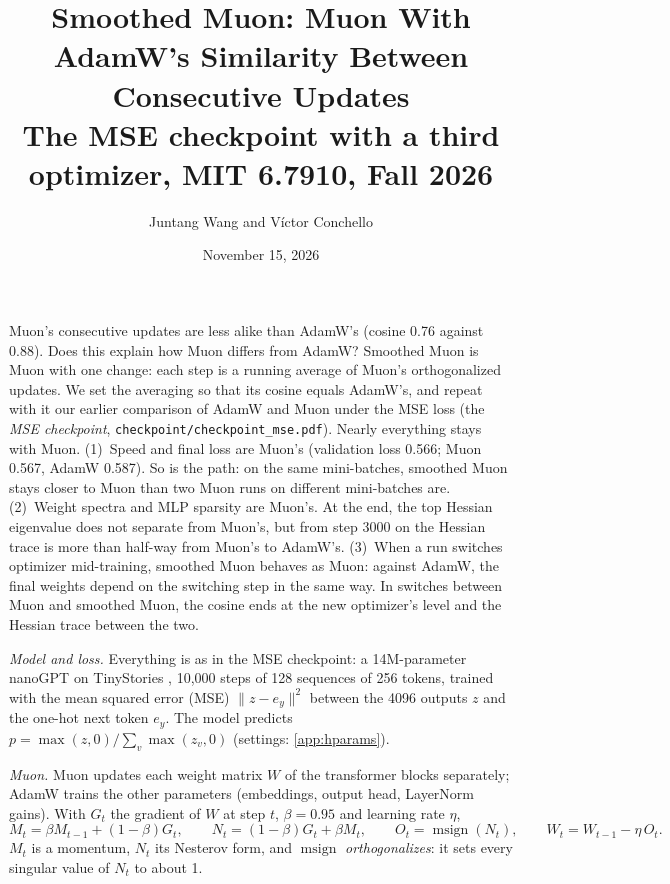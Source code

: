 \documentclass[10pt]{article}
\title{Smoothed Muon: Muon With AdamW's Similarity Between Consecutive Updates\\[1pt]
\normalfont The MSE checkpoint with a third optimizer, MIT 6.7910, Fall 2026}
\author{Juntang Wang and V\'ictor Conchello}
\date{November 15, 2026}
\makeatletter
\renewcommand\paragraph{\@startsection{paragraph}{4}{\z@}{1.0ex \@plus .3ex \@minus .2ex}{-1em}{\normalfont\normalsize\bfseries}}
\renewcommand\maketitle{\begin{center}{\large\bfseries\@title\par}\vspace{3pt}\@author\quad\textperiodcentered\quad\@date\end{center}}
\makeatother
\begin{document}
\maketitle
\vspace{-0.8em}

\paragraph{Summary.} Muon's consecutive updates are less alike than AdamW's (cosine 0.76 against 0.88). Does this
explain how Muon differs from AdamW? Smoothed Muon is Muon with one change: each step is a running average of Muon's
orthogonalized updates. We set the averaging so that its cosine equals AdamW's, and repeat with it our earlier
comparison of AdamW and Muon under the MSE loss (the \emph{MSE checkpoint}, \texttt{checkpoint/checkpoint\_mse.pdf}).
Nearly everything stays with Muon. (1)~Speed and final loss are Muon's (validation loss 0.566; Muon 0.567, AdamW
0.587). So is the path: on the same mini-batches, smoothed Muon stays closer to Muon than two Muon runs on different
mini-batches are. (2)~Weight spectra and MLP sparsity are Muon's. At the end, the top Hessian eigenvalue does not separate from Muon's, but
from step 3000 on the Hessian trace is more than half-way from Muon's to AdamW's. (3)~When a run switches optimizer
mid-training, smoothed Muon behaves as Muon: against AdamW, the final weights depend on the switching step in the same
way. In switches between Muon and smoothed Muon, the cosine ends at the new optimizer's level and the Hessian trace
between the two.

\paragraph{Setup.} \emph{Model and loss.} Everything is as in the MSE checkpoint: a 14M-parameter nanoGPT \citep{karpathy2022nanogpt} on TinyStories \citep{eldan2023tinystories}, 10{,}000 steps of 128
sequences of 256 tokens, trained with the mean squared error (MSE) $\|z-e_y\|^2$ between the 4096 outputs $z$ and the
one-hot next token $e_y$. The model predicts $p=\max(z,0)/\sum_v\max(z_v,0)$ (settings: \cref{app:hparams}).

\emph{Muon.} Muon \citep{jordan2024muon} updates each weight matrix $W$ of the transformer blocks separately; AdamW
trains the other parameters (embeddings, output head, LayerNorm gains). With $G_t$ the gradient of $W$ at step $t$,
$\beta=0.95$ and learning rate $\eta$,
\[
M_t=\beta M_{t-1}+(1-\beta)G_t,\qquad N_t=(1-\beta)G_t+\beta M_t,\qquad O_t=\operatorname{msign}(N_t),\qquad
W_t=W_{t-1}-\eta\,O_t .
\]
$M_t$ is a momentum, $N_t$ its Nesterov form, and $\operatorname{msign}$ \emph{orthogonalizes}: it sets every singular
value of $N_t$ to about 1.
\end{document}
